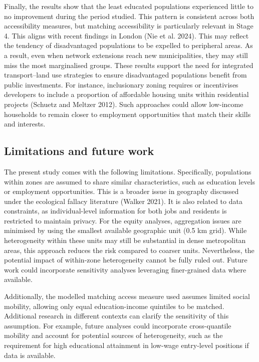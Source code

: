 \documentclass{article}
\begin{document}
Finally, the results show that the least educated populations
experienced little to no improvement during the period studied. This
pattern is consistent across both accessibility measures, but matching
accessibility is particularly relevant in Stage 4. This aligns with
recent findings in London (Nie et al. 2024). This may reflect the
tendency of disadvantaged populations to be expelled to peripheral
areas. As a result, even when network extensions reach new
municipalities, they may still miss the most marginalised groups. These
results support the need for integrated transport--land use strategies
to ensure disadvantaged populations benefit from public investments. For
instance, inclusionary zoning requires or incentivises developers to
include a proportion of affordable housing units within residential
projects (Schuetz and Meltzer 2012). Such approaches could allow
low-income households to remain closer to employment opportunities that
match their skills and interests.

\subsection{Limitations and future
work}\label{limitations-and-future-work}

The present study comes with the following limitations. Specifically,
populations within zones are assumed to share similar characteristics,
such as education levels or employment opportunities. This is a broader
issue in geography discussed under the ecological fallacy literature
(Walker 2021). It is also related to data constraints, as
individual-level information for both jobs and residents is restricted
to maintain privacy. For the equity analyses, aggregation issues are
minimised by using the smallest available geographic unit (0.5 km grid).
While heterogeneity within these units may still be substantial in dense
metropolitan areas, this approach reduces the risk compared to coarser
units. Nevertheless, the potential impact of within-zone heterogeneity
cannot be fully ruled out. Future work could incorporate sensitivity
analyses leveraging finer-grained data where available.

Additionally, the modelled matching access measure used assumes limited
social mobility, allowing only equal education-income quintiles to be
matched. Additional research in different contexts can clarify the
sensitivity of this assumption. For example, future analyses could
incorporate cross-quantile mobility and account for potential sources of
heterogeneity, such as the requirement for high educational attainment
in low-wage entry-level positions if data is available.
\end{document}
